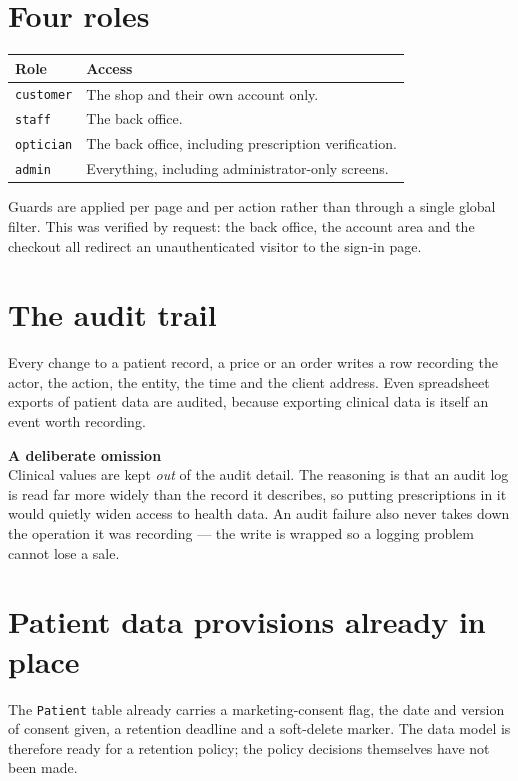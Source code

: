\documentclass[11pt,a4paper]{report}
\newcommand{\code}[1]{\texttt{\small #1}}
\newcommand{\keybox}[2]{%
  \begin{center}
  \begin{minipage}{0.94\textwidth}
  \colorbox{vclight}{\parbox{\dimexpr\textwidth-2\fboxsep}{%
    \vspace{3pt}\textbf{\color{vcblue}#1}\\[3pt]#2\vspace{4pt}}}
  \end{minipage}
  \end{center}}
\begin{document}
\section{Four roles}

\begin{center}
\begin{tabular}{@{}lp{}@{}}
\toprule
\textbf{Role} & \textbf{Access}\\
\midrule
\code{customer} & The shop and their own account only.\\
\code{staff} & The back office.\\
\code{optician} & The back office, including prescription verification.\\
\code{admin} & Everything, including administrator-only screens.\\
\bottomrule
\end{tabular}
\end{center}

Guards are applied per page and per action rather than through a single global
filter. This was verified by request: the back office, the account area and
the checkout all redirect an unauthenticated visitor to the sign-in page.

\section{The audit trail}

Every change to a patient record, a price or an order writes a row recording
the actor, the action, the entity, the time and the client address. Even
spreadsheet exports of patient data are audited, because exporting clinical
data is itself an event worth recording.

\keybox{A deliberate omission}{Clinical values are kept \emph{out} of the audit
detail. The reasoning is that an audit log is read far more widely than the
record it describes, so putting prescriptions in it would quietly widen access
to health data. An audit failure also never takes down the operation it was
recording --- the write is wrapped so a logging problem cannot lose a sale.}

\section{Patient data provisions already in place}

The \code{Patient} table already carries a marketing-consent flag, the date
and version of consent given, a retention deadline and a soft-delete marker.
The data model is therefore ready for a retention policy; the policy decisions
themselves have not been made.
\end{document}
